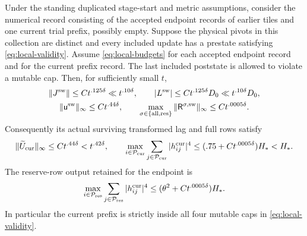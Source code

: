 \begin{lemma}\label{lem:local-transfer}
Under the standing duplicated stage-start and metric assumptions,
consider the numerical record consisting of the accepted endpoint
records of earlier tiles and one current trial prefix, possibly empty.
Suppose the physical pivots in this collection are distinct and every
included update has a prestate satisfying \eqref{eq:local-validity}.
Assume \eqref{eq:local-budgets} for each accepted endpoint record and
for the current prefix record.  The last included poststate is allowed
to violate a mutable cap.  Then, for sufficiently small \(t\),
\[
 \begin{gathered}
 \|J^{\rm sw}\|\le Ct^{.125\delta}\ll t^{.10\delta},\qquad
 |L^{\rm sw}|\le Ct^{.125\delta}D_0\ll t^{.10\delta}D_0,\\
 \|\mathsf u^{\rm sw}\|_\infty\le Ct^{.44\delta},\qquad
 \max_{\sigma\in\{\mathrm{all},\mathrm{res}\}}
       \|\mathsf R^{\sigma,\rm sw}\|_\infty\le Ct^{.0005\delta}.
 \end{gathered}
\]
Consequently its actual surviving transformed lag and full rows satisfy
\[
 \|\widetilde U_{\rm cur}\|_\infty
       \le Ct^{.44\delta}<t^{.42\delta},\qquad
 \max_{i\in\mathcal P_{\rm cur}}
       \sum_{j\in\mathcal P_{\rm cur}}|h^{\rm cur}_{ij}|^4
       \le(.75+Ct^{.0005\delta})H_*<H_*.
\]
The reserve-row output retained for the endpoint is
\[
 \max_{i\in\mathcal P_{\rm res}}
       \sum_{j\in\mathcal P_{\rm res}}|h^{\rm cur}_{ij}|^4
       \le(\theta^2+Ct^{.0005\delta})H_*.
\]
In particular the current prefix is strictly inside all four mutable
caps in \eqref{eq:local-validity}.
\end{lemma}

